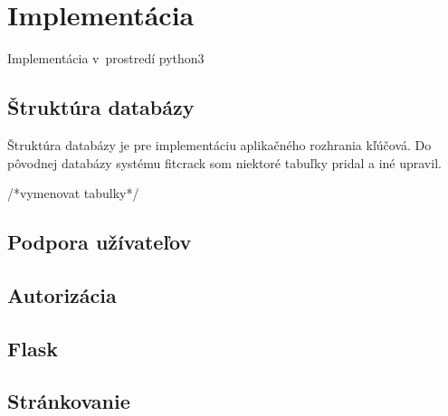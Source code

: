 \documentclass[../projekt.tex]{subfiles}
\begin{document}
\chapter{Implementácia}\label{implementacia}
Implementácia v~prostredí python3


\section{Štruktúra databázy}
Štruktúra databázy je pre implementáciu aplikačného rozhrania kľúčová. Do pôvodnej databázy systému fitcrack som niektoré tabuľky pridal a iné upravil.

/*vymenovat tabulky*/


\section{Podpora užívateľov}

\section{Autorizácia}

\section{Flask}

\section{Stránkovanie}
\end{document}
